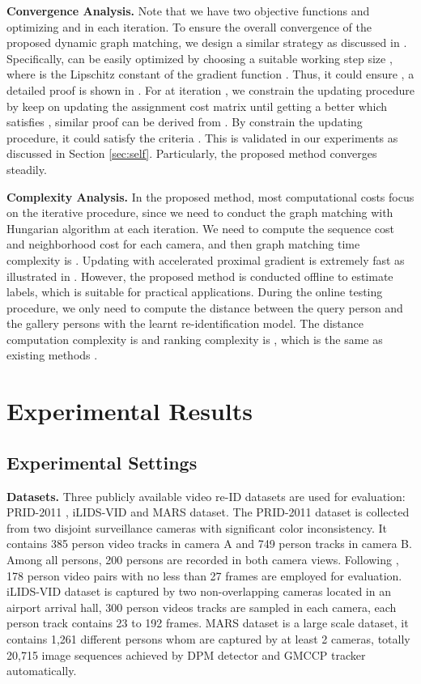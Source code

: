 \documentclass[10pt,twocolumn,letterpaper]{article}
\begin{document}
\textbf{Convergence Analysis.} Note that we have two objective functions  and  optimizing  and  in each iteration. To ensure the overall convergence of the proposed dynamic graph matching, we design a similar strategy as discussed in \cite{eccv12graph}. Specifically,  can be easily optimized by choosing a suitable working step size , where  is the Lipschitz constant of the gradient function . Thus, it could ensure , a detailed proof is shown in \cite{apg09}. For  at iteration , we constrain the updating procedure by keep on updating the assignment cost matrix  until getting a better  which satisfies , similar proof can be derived from \cite{eccv12graph}. By constrain the updating procedure, it could satisfy the criteria . This is validated in our experiments as discussed in Section \ref{sec:self}. Particularly, the proposed method converges steadily.

\textbf{Complexity Analysis.} In the proposed method, most computational costs focus on the iterative procedure, since we need to conduct the graph matching with Hungarian algorithm at each iteration. We need to compute the sequence cost  and neighborhood cost  for each camera, and then graph matching time complexity is . Updating  with accelerated proximal gradient is extremely fast as illustrated in \cite{apg09}. However, the proposed method is conducted offline to estimate labels, which is suitable for practical applications. During the online testing procedure, we only need to compute the distance between the query person  and the gallery persons with the learnt re-identification model. The distance computation complexity is  and ranking complexity is , which is the same as existing methods \cite{cvpr16top,iccv15liao}.

\section{Experimental Results}
\subsection{Experimental Settings}

\textbf{Datasets.} Three publicly available video re-ID datasets are used for evaluation: PRID-2011 \cite{prid2011}, iLIDS-VID \cite{eccv14video} and MARS \cite{eccv16mars} dataset.
The PRID-2011 dataset is collected from two disjoint surveillance cameras with significant color inconsistency. It contains 385 person video tracks in camera A and 749 person tracks in camera B. Among all persons, 200 persons are recorded in both camera views. Following \cite{cvpr16top,ijcai16video,iccv15des,eccv16mars}, 178 person video pairs with no less than 27 frames are employed for evaluation.
iLIDS-VID dataset is captured by two non-overlapping cameras located in an airport arrival hall, 300 person videos tracks are sampled in each camera, each person track contains 23 to 192 frames.
MARS dataset is a large scale dataset, it contains 1,261 different persons whom are captured by at least 2 cameras, totally 20,715 image sequences achieved by DPM detector and GMCCP tracker automatically.
\end{document}
